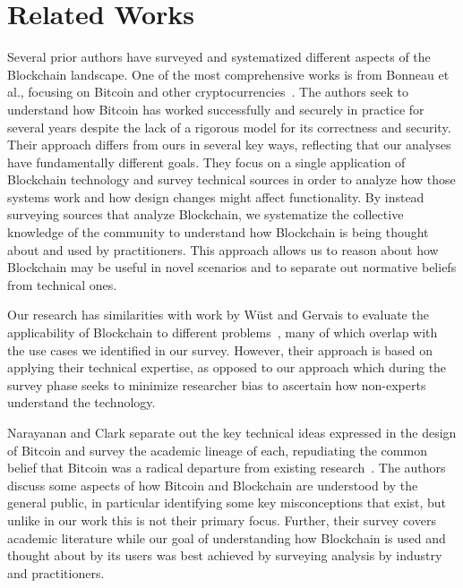 
\section{Related Works}
Several prior authors have surveyed and systematized different aspects of the Blockchain landscape.
One of the most comprehensive works is from Bonneau et al., focusing on Bitcoin and other cryptocurrencies~\cite{BMC+15}. The authors seek to understand how Bitcoin has worked successfully and securely in practice for several years despite the lack of a rigorous model for its correctness and security. %
Their approach differs from ours in several key ways, reflecting that our analyses have fundamentally different goals. They focus on a single application of Blockchain technology and survey technical sources in order to analyze how those systems work and how design changes might affect functionality. By instead surveying sources that analyze Blockchain, we systematize the collective knowledge of the community to understand how Blockchain is being thought about and used by practitioners. This approach allows us to reason about how Blockchain may be useful in novel scenarios and to separate out normative beliefs from technical ones. 

Our research has similarities with work by W{\"u}st and Gervais to evaluate the applicability of Blockchain to different problems~\cite{Wust17}, many of which overlap with the use cases we identified in our survey. However, their approach is based on applying their technical expertise, as opposed to our approach which during the survey phase seeks to minimize researcher bias to ascertain how non-experts understand the technology.

Narayanan and Clark separate out the key technical ideas expressed in the design of Bitcoin and survey the academic lineage of each, repudiating the common belief that Bitcoin was a radical departure from existing research~\cite{Narayanan17}. The authors discuss some aspects of how Bitcoin and Blockchain are understood by the general public, in particular identifying some key misconceptions that exist, but unlike in our work this is not their primary focus. Further, their survey covers academic literature while our goal of understanding how Blockchain is used and thought about by its users was best achieved by surveying analysis by industry and practitioners.

